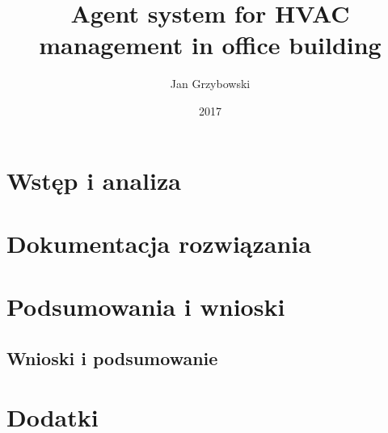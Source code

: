 \documentclass[pl]{minipw} %
\title{Agent system for HVAC management in office building} %
\author{Jan Grzybowski}
\date{2017}
\begin{document}
\sloppy
  
\setcounter{page}{1}

% 


\tableofcontents

\cleardoublepage
\pagestyle{fancy}

\part{Wstęp i analiza}



\part{Dokumentacja rozwiązania}








\part{Podsumowania i wnioski}
\chapter{Wnioski i podsumowanie}






\part{Dodatki}
\begin{appendices}
   
   
\end{appendices}


\end{document}
